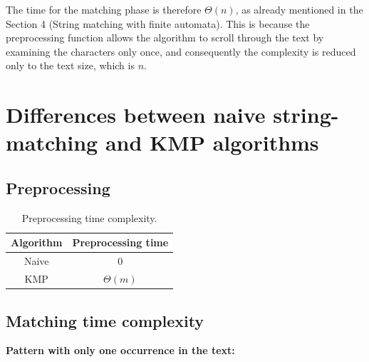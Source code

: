 \documentclass[11pt]{article}
\begin{document}
            The time for the matching phase is therefore $\Theta(n)$, as already mentioned in the Section 4 (String matching with finite automata).
            This is because the preprocessing function allows the algorithm to scroll through the text by examining the characters only once,
            and consequently the complexity is reduced only to the text size, which is $n$.

    \section{Differences between naive string-matching and KMP algorithms} \label{sec:naive_kmp_differences}

        \subsection{Preprocessing} \label{subsec:preprocessing}

            \begin{table}[H]
                \centering
                \begin{tabular}{|c|c|}
                    \hline
                    \textbf{Algorithm} & \textbf{Preprocessing time} \\
                    \hline
                    Naive & {$0$} \\
                    \hline
                    KMP & {$\Theta(m)$} \\
                    \hline
                    \end{tabular}
                \caption{Preprocessing time complexity.}
                \label{tab:preprocessing_time_complexity}
            \end{table}

        \subsection{Matching time complexity} \label{subsec:naive_kmp_time_complexity}

            \quad \textbf{Pattern with only one occurrence in the text:}
\end{document}

